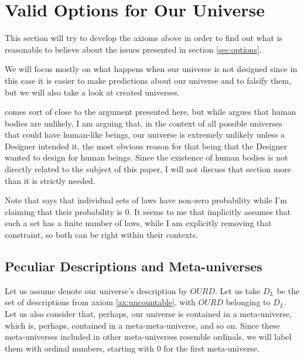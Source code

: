 \documentclass[a4paper
,draft
]{article}
\def\descriptions{D_L}
\def\our_description{OURD}
\newcommand{\paper}[1]{paper}
\newcommand{\ghilimele}[1]{``#1"}
\begin{document}
\section{Valid Options for Our Universe}
\label{sec:valid-options}

This section will try to develop the axioms above in order to find out what
is reasonable to believe about the issues presented in
section \ref{sec:options}.

We will focus mostly on what happens when our universe is not designed
since in this case it is easier to make predictions about our universe
and to falsify them, but we will also take a look at created universes.

\textcite[][Section \ghilimele{Why a world with human bodies is unlikely
if there is no God}]{Swinburne2003} comes sort of close to the argument
presented here, but while \citeauthor{Swinburne2003}
argues that human bodies are unlikely, I am arguing that, in the context
of all possible universes that could have human-like beings,
our universe is extremely unlikely unless a Designer intended it, the most
obvious reason for that being that the Designer wanted to design for human
beings.
Since the existence of human bodies is not directly related to the subject
of this \paper{}, I will not discuss that section more
than it is strictly needed.

Note that  \citeauthor{Swinburne2003} says that individual sets of laws
have non-zero probability while I'm claiming that their probability is $0$.
It seems to me that \citeauthor{Swinburne2003} implicitly assumes that
such a set has a finite number of laws, while I am explicitly removing
that constraint, so both can be right within their contexts.

\subsection{Peculiar Descriptions and Meta-universes}
\label{fdaumu}

Let us assume denote our universe's description by
$\our_description$. Let us take $\descriptions$ be the set of descriptions from
axiom \ref{ax:uncountable}, with $\our_description$ belonging to $\descriptions$.
Let us also consider that, perhaps, our universe is contained
in a meta-universe, which is, perhaps, contained in
a meta-meta-universe, and so on. Since these meta-universes included in other
meta-universes resemble ordinals, we will label them with ordinal numbers,
starting with $0$ for the first meta-universe.
\end{document}
